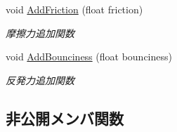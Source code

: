 \begin{DoxyCompactItemize}
void \mbox{\hyperlink{class_physics_a77e9a04f034ccad4fec996832fb7ce63}{Add\+Friction}} (float friction)
\begin{DoxyCompactList}\small\item\em 摩擦力追加関数 \end{DoxyCompactList}\item 
void \mbox{\hyperlink{class_physics_af88191e5605a97952caefd19319b05f9}{Add\+Bounciness}} (float bounciness)
\begin{DoxyCompactList}\small\item\em 反発力追加関数 \end{DoxyCompactList}\end{DoxyCompactItemize}
\subsection*{非公開メンバ関数}
